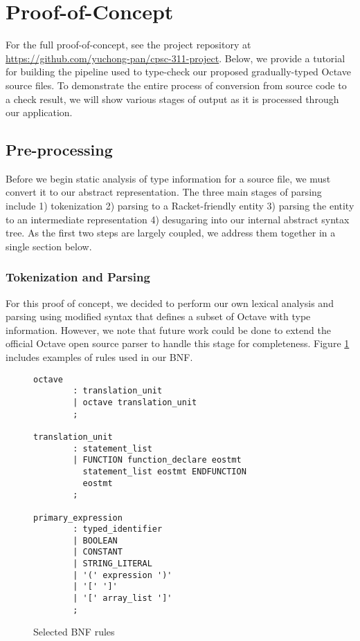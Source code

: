 \section{Proof-of-Concept}
For the full proof-of-concept, see the project repository at \url{https://github.com/yuchong-pan/cpsc-311-project}. Below, we provide a tutorial for building the pipeline used to type-check our proposed gradually-typed Octave source files. To demonstrate the entire process of conversion from source code to a check result, we will show various stages of output as it is processed through our application.

\subsection{Pre-processing}
Before we begin static analysis of type information for a source file, we must convert it to our abstract representation. The three main stages of parsing include 1) tokenization 2) parsing to a Racket-friendly entity 3) parsing the entity to an intermediate representation 4) desugaring into our internal abstract syntax tree. As the first two steps are largely coupled, we address them together in a single section below.

\subsubsection{Tokenization and Parsing}
For this proof of concept, we decided to perform our own lexical analysis and parsing using modified syntax that defines a subset of Octave with type information. However, we note that future work could be done to extend the official Octave open source parser \cite{johneaton2018octaveparser} to handle this stage for completeness. Figure \ref{fig:bnf} includes examples of rules used in our BNF.

\begin{figure}[h]
    \begin{lstlisting}
octave
        : translation_unit
        | octave translation_unit
        ;

translation_unit
        : statement_list
        | FUNCTION function_declare eostmt
          statement_list eostmt ENDFUNCTION
          eostmt
        ;

primary_expression
        : typed_identifier
        | BOOLEAN
        | CONSTANT
        | STRING_LITERAL
        | '(' expression ')'
        | '[' ']'
        | '[' array_list ']'
        ;
    \end{lstlisting}
    \caption[]{Selected BNF rules}
    \label{fig:bnf}
\end{figure}

